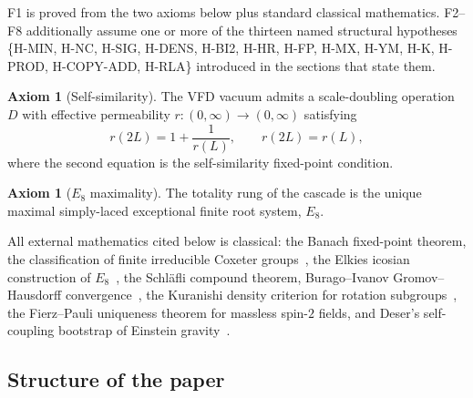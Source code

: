 \documentclass[12pt]{article}
\theoremstyle{definition}
\newtheorem{axiom}[theorem]{Axiom}
\theoremstyle{remark}
\begin{document}
F1 is proved from the two axioms below plus standard classical mathematics. F2--F8 additionally assume one or more of the thirteen named structural hypotheses \{H-MIN, H-NC, H-SIG, H-DENS, H-BI2, H-HR, H-FP, H-MX, H-YM, H-K, H-PROD, H-COPY-ADD, H-RLA\} introduced in the sections that state them.

\begin{axiom}[Self-similarity]\label{ax:self-sim}
The VFD vacuum admits a scale-doubling operation $D$ with effective permeability $r : (0, \infty) \to (0, \infty)$ satisfying
\begin{equation}\label{eq:self-sim}
r(2L) = 1 + \frac{1}{r(L)}, \qquad r(2L) = r(L),
\end{equation}
where the second equation is the self-similarity fixed-point condition.
\end{axiom}

\begin{axiom}[$E_8$ maximality]\label{ax:e8}
The totality rung of the cascade is the unique maximal simply-laced exceptional finite root system, $E_8$.
\end{axiom}

All external mathematics cited below is classical: the Banach fixed-point theorem, the classification of finite irreducible Coxeter groups~\citep{Coxeter1973,Bourbaki2002}, the Elkies icosian construction of $E_8$~\citep{ConwaySloane1999}, the Schl\"afli compound theorem, Burago--Ivanov Gromov--Hausdorff convergence~\citep{BBI2001}, the Kuranishi density criterion for rotation subgroups~\citep{Kuranishi1951}, the Fierz--Pauli uniqueness theorem for massless spin-$2$ fields, and Deser's self-coupling bootstrap of Einstein gravity~\citep{Deser1970}.

\subsection{Structure of the paper}
\end{document}
